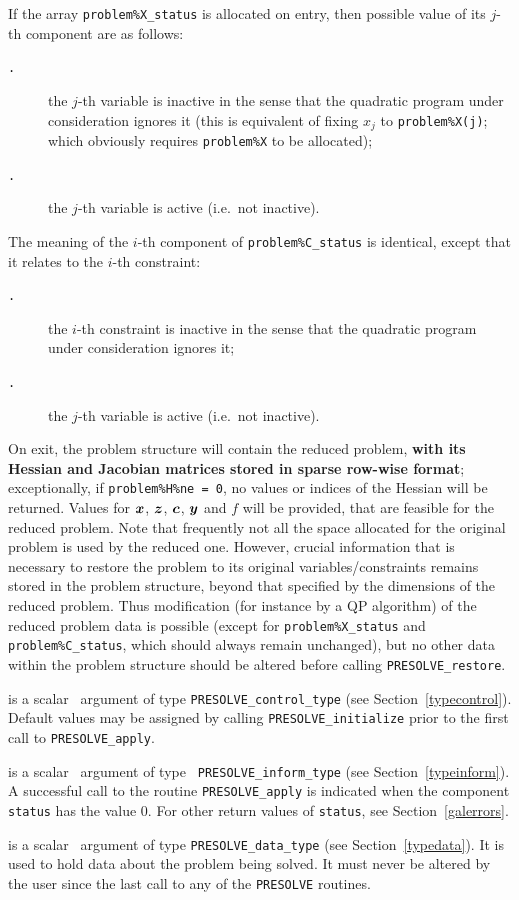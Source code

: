 \documentclass{galahad}
\newcommand{\packagename}{PRESOLVE}
\newcommand{\sym}{\tt\small}
\begin{document}
\begin{description}
\noindent
If the array {\tt problem\%X\_status} is allocated on entry, then possible
value of its $j$-th component are as follows:
\begin{description}
\item[\sym \galsyminactive.] the $j$-th variable is inactive in the sense that
the quadratic program under consideration ignores it (this is equivalent of
fixing $x_j$ to {\tt problem\%X(j)}; which obviously requires {\tt problem\%X}
to be allocated);
\item[\sym \galsymactive. ] the $j$-th variable is active (i.e.\ not
inactive).
\end{description}
The meaning of the $i$-th component of {\tt problem\%C\_status} is identical,
except that it relates to the $i$-th constraint:
\begin{description}
\item[\sym \galsyminactive.] the $i$-th constraint is inactive in the sense
that the quadratic program under consideration ignores it;
\item[\sym \galsymactive. ] the $j$-th variable is active (i.e.\ not
inactive).
\end{description}

\noindent
On exit, the problem structure will contain the reduced problem, {\bf with its
Hessian and Jacobian matrices stored in sparse row-wise format}; exceptionally, 
if {\tt problem\%H\%ne = 0}, no values or indices of the Hessian will be
returned.
Values for ${\bm{x}}$, ${\bm{z}}$, ${\bm{c}}$, ${\bm{y}}$ and $f$ will be provided, that are
feasible for the reduced problem. Note that frequently not
all the space allocated for the original problem is used by the
reduced one.  However, crucial information that is necessary to restore the
problem to its original variables/constraints remains stored in the problem
structure, beyond that specified by the dimensions of the reduced problem.
Thus modification (for instance by a QP algorithm) of the reduced problem data
is possible (except for {\tt problem\%X\_status} and {\tt problem\%C\_status},
which should always remain unchanged), but no other data within the problem
structure should be altered before calling {\tt \packagename\_restore}.

 is a scalar \intentinout\ argument of type
{\tt \packagename\_control\_type}
(see Section~\ref{typecontrol}). Default values may be assigned by calling
{\tt \packagename\_initialize} prior to the first call to
{\tt \packagename\_apply}.

 is a scalar \intentinout\ argument of type {\tt
\packagename\_inform\_type}
(see Section~\ref{typeinform}). A successful call to the routine
{\tt \packagename\_apply}
is indicated when the  component {\tt status} has the value 0.
For other return values of {\tt status}, see Section~\ref{galerrors}.

 is a scalar \intentinout\ argument of type
{\tt \packagename\_data\_type}
(see Section~\ref{typedata}). It is used to hold data about the problem being
solved. It must never be  altered by the user since the last call to
any of the {\tt \packagename} routines.

\end{description}
\end{document}
